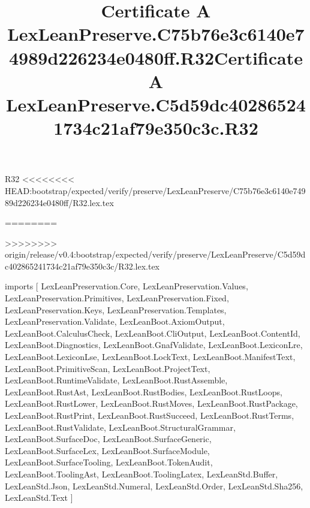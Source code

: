 \begin{lexlean}{R32}
<<<<<<<< HEAD:bootstrap/expected/verify/preserve/LexLeanPreserve/C75b76e3c6140e74989d226234e0480ff/R32.lex.tex
\title{Certificate A LexLeanPreserve.C75b76e3c6140e74989d226234e0480ff.R32}
========
\title{Certificate A LexLeanPreserve.C5d59dc402865241734c21af79e350c3c.R32}
>>>>>>>> origin/release/v0.4:bootstrap/expected/verify/preserve/LexLeanPreserve/C5d59dc402865241734c21af79e350c3c/R32.lex.tex
\begin{coremodule}
imports [
  LexLeanPreservation.Core,
  LexLeanPreservation.Values,
  LexLeanPreservation.Primitives,
  LexLeanPreservation.Fixed,
  LexLeanPreservation.Keys,
  LexLeanPreservation.Templates,
  LexLeanPreservation.Validate,
  LexLeanBoot.AxiomOutput,
  LexLeanBoot.CalculusCheck,
  LexLeanBoot.CliOutput,
  LexLeanBoot.ContentId,
  LexLeanBoot.Diagnostics,
  LexLeanBoot.GnafValidate,
  LexLeanBoot.LexiconLre,
  LexLeanBoot.LexiconLse,
  LexLeanBoot.LockText,
  LexLeanBoot.ManifestText,
  LexLeanBoot.PrimitiveScan,
  LexLeanBoot.ProjectText,
  LexLeanBoot.RuntimeValidate,
  LexLeanBoot.RustAssemble,
  LexLeanBoot.RustAst,
  LexLeanBoot.RustBodies,
  LexLeanBoot.RustLoops,
  LexLeanBoot.RustLower,
  LexLeanBoot.RustMoves,
  LexLeanBoot.RustPackage,
  LexLeanBoot.RustPrint,
  LexLeanBoot.RustSucceed,
  LexLeanBoot.RustTerms,
  LexLeanBoot.RustValidate,
  LexLeanBoot.StructuralGrammar,
  LexLeanBoot.SurfaceDoc,
  LexLeanBoot.SurfaceGeneric,
  LexLeanBoot.SurfaceLex,
  LexLeanBoot.SurfaceModule,
  LexLeanBoot.SurfaceTooling,
  LexLeanBoot.TokenAudit,
  LexLeanBoot.ToolingAst,
  LexLeanBoot.ToolingLatex,
  LexLeanStd.Buffer,
  LexLeanStd.Json,
  LexLeanStd.Numeral,
  LexLeanStd.Order,
  LexLeanStd.Sha256,
  LexLeanStd.Text
]


\end{coremodule}
\end{lexlean}
